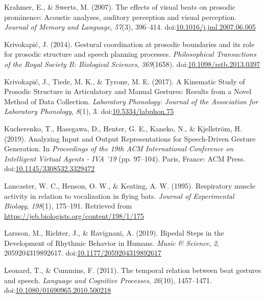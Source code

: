 \documentclass[
  man, noextraspace,floatsintext]{apa6}
\newlength{\cslhangindent}
\newenvironment{cslreferences}%
  {\setlength{\parindent}{0pt}%
  \everypar{\setlength{\hangindent}{\cslhangindent}}\ignorespaces}%
  {\par}
\begin{document}
\begin{cslreferences}
\leavevmode\hypertarget{ref-krahmerEffectsVisualBeats2007}{}%
Krahmer, E., \& Swerts, M. (2007). The effects of visual beats on prosodic prominence: Acoustic analyses, auditory perception and visual perception. \emph{Journal of Memory and Language}, \emph{57}(3), 396--414. doi:\href{https://doi.org/10.1016/j.jml.2007.06.005}{10.1016/j.jml.2007.06.005}

\leavevmode\hypertarget{ref-krivokapicGesturalCoordinationProsodic2014}{}%
Krivokapić, J. (2014). Gestural coordination at prosodic boundaries and its role for prosodic structure and speech planning processes. \emph{Philosophical Transactions of the Royal Society B: Biological Sciences}, \emph{369}(1658). doi:\href{https://doi.org/10.1098/rstb.2013.0397}{10.1098/rstb.2013.0397}

\leavevmode\hypertarget{ref-krivokapicKinematicStudyProsodic2017}{}%
Krivokapić, J., Tiede, M. K., \& Tyrone, M. E. (2017). A Kinematic Study of Prosodic Structure in Articulatory and Manual Gestures: Results from a Novel Method of Data Collection. \emph{Laboratory Phonology: Journal of the Association for Laboratory Phonology}, \emph{8}(1), 3. doi:\href{https://doi.org/10.5334/labphon.75}{10.5334/labphon.75}

\leavevmode\hypertarget{ref-kucherenkoAnalyzingInputOutput2019}{}%
Kucherenko, T., Hasegawa, D., Henter, G. E., Kaneko, N., \& Kjellström, H. (2019). Analyzing Input and Output Representations for Speech-Driven Gesture Generation. In \emph{Proceedings of the 19th ACM International Conference on Intelligent Virtual Agents - IVA '19} (pp. 97--104). Paris, France: ACM Press. doi:\href{https://doi.org/10.1145/3308532.3329472}{10.1145/3308532.3329472}

\leavevmode\hypertarget{ref-lancasterRespiratoryMuscleActivity1995}{}%
Lancaster, W. C., Henson, O. W., \& Keating, A. W. (1995). Respiratory muscle activity in relation to vocalization in flying bats. \emph{Journal of Experimental Biology}, \emph{198}(1), 175--191. Retrieved from \url{https://jeb.biologists.org/content/198/1/175}

\leavevmode\hypertarget{ref-larssonBipedalStepsDevelopment2019}{}%
Larsson, M., Richter, J., \& Ravignani, A. (2019). Bipedal Steps in the Development of Rhythmic Behavior in Humans. \emph{Music \& Science}, \emph{2}, 2059204319892617. doi:\href{https://doi.org/10.1177/2059204319892617}{10.1177/2059204319892617}

\leavevmode\hypertarget{ref-leonardTemporalRelationBeat2011}{}%
Leonard, T., \& Cummins, F. (2011). The temporal relation between beat gestures and speech. \emph{Language and Cognitive Processes}, \emph{26}(10), 1457--1471. doi:\href{https://doi.org/10.1080/01690965.2010.500218}{10.1080/01690965.2010.500218}


\end{cslreferences}
\end{document}

